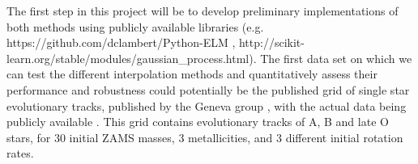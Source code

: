 \documentclass[preprint]{aastex}
\begin{document}
The first step in this project will be to develop preliminary implementations of both methods using publicly available libraries (e.g. https://github.com/dclambert/Python-ELM , http://scikit-learn.org/stable/modules/gaussian\_process.html). The first data set on which we can test the different interpolation methods and quantitatively assess their performance and robustness could potentially be the published grid of single star evolutionary tracks, published by the Geneva group \citep{Georgy:2013jp}, with the actual data being publicly available \citep{Georgy:2013wg}. This grid contains evolutionary tracks of A, B and late O stars, for 30 initial ZAMS masses, 3 metallicities, and 3 different initial rotation rates.





\end{document}
